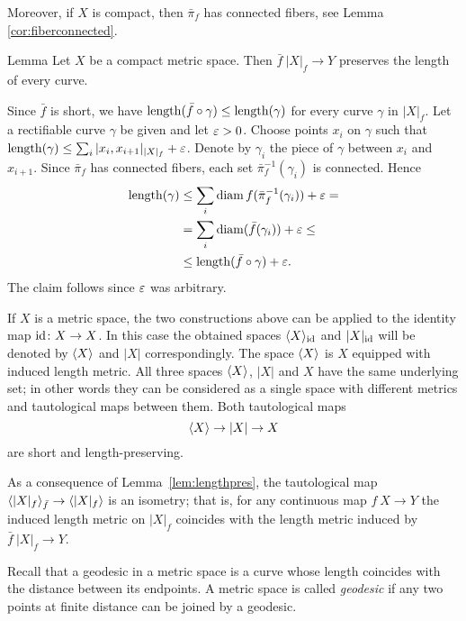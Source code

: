 \documentclass{article}
\begin{document}
Moreover, if $X$ is compact, then $\bar\pi_f$ has connected fibers, see Lemma \ref{cor:fiberconnected}.

\begin{thm}{Lemma}\label{lem:lengthpres}
Let $X$ be a compact metric space. 
Then $\bar f\:|X|_f\to Y$ preserves the length of every curve.
\end{thm}

Since $\bar f$ is short, we have $\mathop{\rm length}\nolimits(\bar f\circ\gamma)\leq \mathop{\rm length}\nolimits(\gamma)$ for every curve $\gamma$ in $|X|_f$.
Let a rectifiable curve $\gamma$ be given and let $\varepsilon>0$. Choose points $x_i$ on $\gamma$ such that $\mathop{\rm length}\nolimits(\gamma)\leq\sum_i |x_i,x_{i+1}|_{|X|_f}+\varepsilon$.
Denote by $\gamma_i$ the piece of $\gamma$ between $x_i$ and $x_{i+1}$. Since $\bar\pi_f$ has connected fibers, each set $\bar\pi_f^{-1}(\gamma_i)$
is connected. Hence 
\begin{align*}
\mathop{\rm length}\nolimits(\gamma)&\leq \sum_i \mathop{\rm diam}\nolimits f(\bar\pi_f^{-1}(\gamma_i))+\varepsilon=
\\
&=\sum_i \mathop{\rm diam}\nolimits(\bar f(\gamma_i))+\varepsilon\leq
\\
&\leq\mathop{\rm length}\nolimits(\bar f\circ\gamma)+\varepsilon.
\end{align*}
The claim follows since $\varepsilon$ was arbitrary.
\qeds

If $X$ is a metric space, the two constructions above can be applied to the identity map $\mathrm{id}\colon X\to X$.
In this case the obtained spaces $\langle X\rangle_{\mathrm{id}}$ and $|X|_{\mathrm{id}}$ will be denoted by $\langle X\rangle$ and $|X|$ correspondingly.
The space $\langle X\rangle$ is $X$ equipped with induced length metric.
All three spaces $\langle X\rangle$, $|X|$ and $X$ have the same underlying set;
in other words they can be considered as a single space with different metrics and tautological maps between them.
Both tautological maps 
\[\langle X\rangle\to |X|\to X\]
are short and length-preserving.

As a consequence of Lemma~\ref{lem:lengthpres}, the tautological map $\<|X|_f\>_{\bar f}\zz\to \<|X|_f\>$ is an isometry;
that is, for any continuous map $f\:X\to Y$ the induced length metric on $|X|_f$ coincides with the length metric induced by 
$\bar f\:|X|_f\to Y$.


Recall that a geodesic in a metric space is a curve whose length coincides with the distance between its endpoints.
A metric space is called \emph{geodesic} if any two points at finite distance can be joined by a geodesic.
\end{document}
